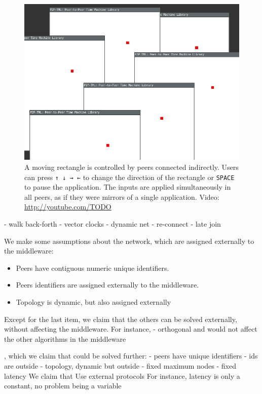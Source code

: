 \documentclass[10pt,journal,compsoc]{IEEEtran}
\newcommand{\code}[1]  {\texttt{\footnotesize{#1}}}
\begin{document}
\begin{figure}[t]
    \centering
    \includegraphics[width=\linewidth]{move}
    \caption[XXX] {
	A moving rectangle is controlled by peers connected indirectly.
	Users can press \code{↑ ↓ → ←} to change the direction of the
	rectangle or \code{SPACE} to pause the application.
	The inputs are applied simultaneously in all peers, as if they were
	mirrors of a single application.
        Video: \url{http://youtube.com/TODO}
        \label{fig.move}
    }
\end{figure}

- walk back-forth
- vector clocks
- dynamic net
- re-connect
- late join

We make some assumptions about the network, which are assigned externally to
the middleware:
%
\begin{itemize}
\item Peers have contiguous numeric unique identifiers.
\item Peers identifiers are assigned externally to the middleware.
\item Topology is dynamic, but also assigned externally

\end{itemize}
%
Except for the last item, we claim that the others can be solved externally,
without affecting the middleware.
For instance,
- orthogonal and would not affect the other algorithms in the middleware

, which we claim that could be
solved further:
- peers have unique identifiers
- ids are outside
- topology, dynamic but outside
- fixed maximum nodes
- fixed latency
We claim that Use external protocols
For instance, latency is only a constant, no problem being a variable
\end{document}
